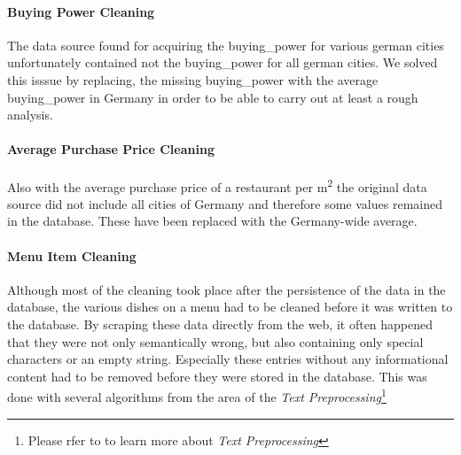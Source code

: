 \paragraph{Buying Power Cleaning}
The data source found for acquiring the buying\_power for various german cities unfortunately contained not the buying\_power for all german cities.
We solved this isssue by replacing, the missing buying\_power with the average buying\_power in Germany in order to be able to carry out at least a rough analysis.
\paragraph{Average Purchase Price Cleaning}
Also with the average purchase price of a restaurant per m\textsuperscript{2} the original data source did not include all cities of Germany and therefore
some  values remained in the database.
These have been replaced with the Germany-wide average.
\paragraph{Menu Item Cleaning}
Although most of the cleaning took place after the persistence of the data in the database, the various dishes on a menu had to be
cleaned before it was written to the database.
By scraping these data directly from the web, it often happened that they were not only semantically wrong, but also containing only
special characters or an empty string.
Especially these entries without any informational content had to be removed before they were stored in the database.
This was done with several algorithms from the area of the \textit{Text Preprocessing}\footnote{Please rfer to  to learn more about \textit{Text Preprocessing}}
